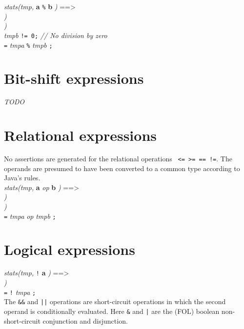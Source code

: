 \noindent
{\em stats(tmp, }{\bf a} {\tt \%} {\bf b} {\em )} ==> \\
 {\em )} \\
 {\em )} \\
 {\em tmpb} {\tt != 0;} {\em // No division by zero}\\
 {\tt =} {\em tmpa} {\tt \%} {\em tmpb} {\tt ;}\\

\section{Bit-shift expressions}

{\em TODO}

\section{Relational expressions}

\noindent
No assertions are generated for the relational operations {\tt < > <= >= == !=}. The operands are presumed to have been converted to a common type according to Java's rules.\\

\noindent
{\em stats(tmp, }{\bf a} {\em op} {\bf b} {\em )} ==> \\
 {\em )} \\
 {\em )} \\
 {\tt =} {\em tmpa} {\em op} {\em tmpb} {\tt ;}\\

\section{Logical expressions}

\noindent
{\em stats(tmp,} {\tt !} {\bf a} {\em )} ==> \\
 {\em )} \\
 {\tt =} {\tt !} {\em tmpa} {\tt ;}\\

\noindent
The {\tt \&\&} and {\tt ||} operations are short-circuit operations in which the second operand is conditionally evaluated.
Here {\tt \&} and {\tt |} are the (FOL) boolean non-short-circuit conjunction and disjunction.\\

